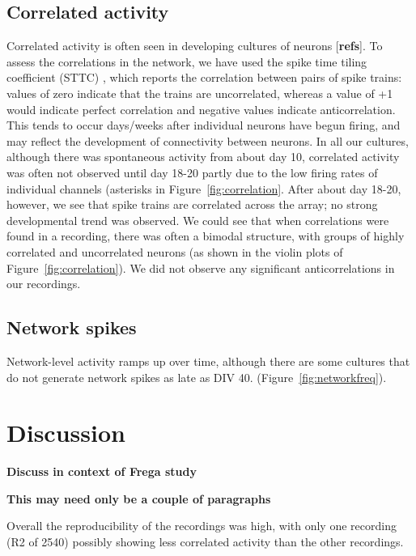 \documentclass[doublespacing]{bmcart}
\begin{document}
\subsection*{Correlated activity}

Correlated activity is often seen in developing cultures of neurons
[\textbf{refs}].  To assess the correlations in the network, we have used the spike time tiling coefficient (STTC) \cite{Cutts2014}, which reports the correlation between pairs of spike trains: values of zero indicate that the trains are uncorrelated, whereas a value of +1 would indicate perfect correlation and negative values indicate anticorrelation.  This tends to occur days/weeks after individual neurons have
begun firing, and may reflect the development of connectivity between
neurons.  In all our cultures, although there was spontaneous activity
from about day 10, correlated activity was often not observed until
day 18-20 partly due to the low firing rates of individual channels
(asterisks in Figure~\ref{fig:correlation}.  After about day 18-20,
however, we see that spike trains are correlated across the array; no
strong developmental trend was observed.  We could see that
when correlations were found in a recording, there was often a bimodal
structure, with groups of highly correlated and uncorrelated neurons
(as shown in the violin plots of Figure~\ref{fig:correlation}).  We did not observe any significant anticorrelations in our recordings.

\subsection*{Network spikes}
Network-level activity ramps up over time, although there are some
cultures that do not generate network spikes as late as DIV 40.
(Figure~\ref{fig:networkfreq}).

\section*{Discussion}
\textbf{Discuss in context of Frega study}  \cite{Frega2019}

\textbf{This may need only be a couple of paragraphs}

Overall the reproducibility of the recordings was high, with only one recording (R2 of 2540) possibly showing less correlated activity than the other recordings.

\vspace*{1cm}
\end{document}
